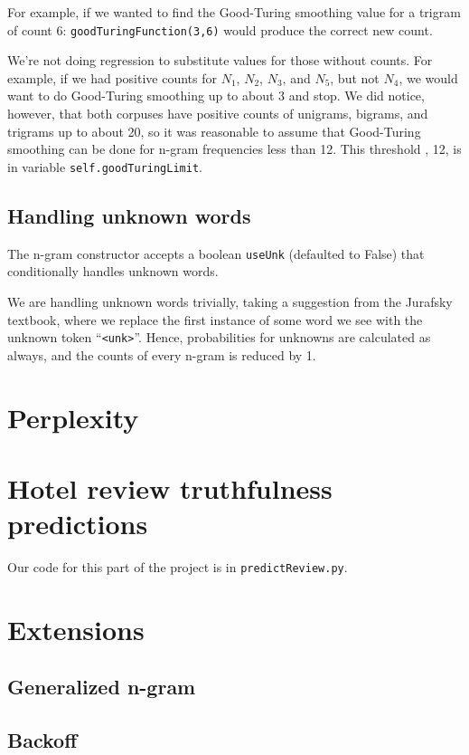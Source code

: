 \documentclass{article}
\begin{document}
For example, if we wanted to find the Good-Turing smoothing value for a trigram of count 6: \texttt{goodTuringFunction(3,6)} would produce the correct new count.

We're not doing regression to substitute values for those without counts. For example, if we had positive counts for $N_1$, $N_2$, $N_3$, and $N_5$, but not $N_4$, we would want to do Good-Turing smoothing up to about 3 and stop. We did notice, however, that both corpuses have positive counts of unigrams, bigrams, and trigrams up to about 20, so it was reasonable to assume that Good-Turing smoothing can be done for n-gram frequencies less than 12. This threshold , 12, is in variable \texttt{self.goodTuringLimit}.

\subsection{Handling unknown words}
The n-gram constructor accepts a boolean \texttt{useUnk} (defaulted to False) that conditionally handles unknown words.\par
We are handling unknown words trivially, taking a suggestion from the Jurafsky textbook, where we replace the first instance of some word we see with the unknown token ``\texttt{<unk>}''. Hence, probabilities for unknowns are calculated as always, and the counts of every n-gram is reduced by 1.

\section{Perplexity}
\lipsum[4]

\section{Hotel review truthfulness predictions}
Our code for this part of the project is in \texttt{predictReview.py}.
\lipsum[4]

\section{Extensions}

\subsection{Generalized n-gram}

\subsection{Backoff}
\end{document}
